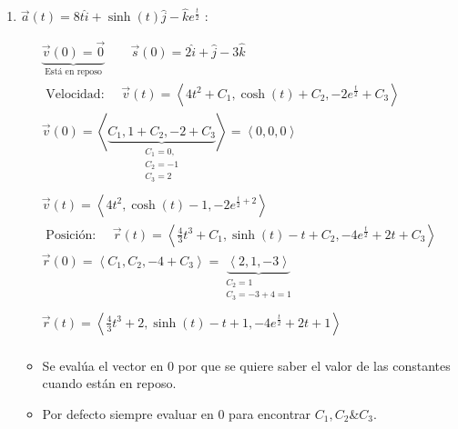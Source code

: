 \begin{enumerate}
    \item $\vec{a}(t)= 8t \hat{i} + \sinh(t)\hat{j} - \hat{k} e^{\frac{t}{2} }$ : 
        \begin{center}
            \begin{align*}
                \underbrace{\vec{v}(0) = \vec{0}}_{\text{  Está en reposo  }} \quad \quad \vec{s}(0) = 2 \hat{i} + \hat{j} - 3 \hat{k}  \\ 
                \text{  Velocidad:   }\quad \vec{v}(t)= \left\langle 4t^2+C_1,\cosh(t)+C_2,-2e^{\frac{t}{2}}+C_3 \right\rangle \\ 
                \vec{v}(0) = \left\langle \underbrace{C_1,1+C_2,-2+C_3}_{\begin{matrix}
                    C_1 = 0, \\  C_2 = -1 \\ C_3 =2 \\ 
                \end{matrix}} \right\rangle = \left\langle 0,0,0 \right\rangle \\ 
                \vec{v}(t) = \left\langle 4t^2,\cosh(t)-1,-2e^{\frac{t}{2} +2} \right\rangle \\ 
                \text{  Posición:   } \quad \vec{r}(t) = \left\langle \frac{4}{3}t^3+C_1, \sinh(t)-t+C_2,-4e^{\frac{t}{2}}+2t+C_3 \right\rangle  \\ 
                \vec{r}(0) = \left\langle C_1,C_2,-4+C_3 \right\rangle = \underbrace{\left\langle 2,1,-3 \right\rangle }_{\begin{matrix}
                    C_2=1 \\ 
                    C_3 = -3+4 = 1 \\ 
                \end{matrix}} \\ 
                \vec{r}(t) = \left\langle \frac{4}{3}t^3+2,\sinh(t)-t+1,-4e^{\frac{t}{2}}+2t+1 \right\rangle \\  
            \end{align*}    
            \begin{itemize}[label=\#]
                \item Se evalúa el vector en 0 por que se quiere saber el valor de las constantes cuando están en reposo.
                \item Por defecto siempre evaluar en 0 para encontrar $C_1,C_2$\&$C_3$.
            \end{itemize}
        \end{center}
\end{enumerate}



